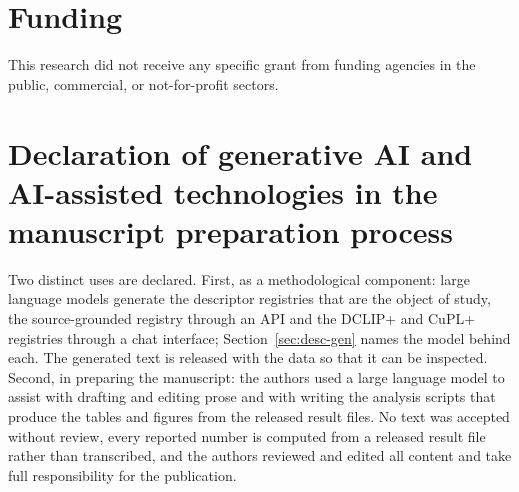 \documentclass[a4paper,fleqn]{cas-dc}
\begin{document}
\section*{Funding}
This research did not receive any specific grant from funding agencies in the public, commercial, or
not-for-profit sectors.

\section*{Declaration of generative AI and AI-assisted technologies in the manuscript preparation
process}
Two distinct uses are declared. First, as a methodological component: large language models generate
the descriptor registries that are the object of study, the source-grounded registry through an API
and the DCLIP+ and CuPL+ registries through a chat interface; Section~\ref{sec:desc-gen} names
the model behind each. The generated
text is released with the data so that it can be inspected. Second, in preparing the manuscript: the
authors used a large language model to assist with drafting and editing prose and with writing the
analysis scripts that produce the tables and figures from the released result files. No text was
accepted without review, every reported number is computed from a released result file rather than
transcribed, and the authors reviewed and edited all content and take full responsibility for the
publication.



\end{document}
